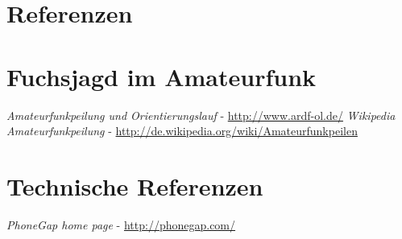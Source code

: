 
\newpage
\section{Referenzen} %
\label{sec:referenzen}

\begin{thebibliography}{breitestes Label}

\section*{Fuchsjagd im Amateurfunk}
    \textit{Amateurfunkpeilung und Orientierungslauf} - \url{http://www.ardf-ol.de/}
    \textit{Wikipedia Amateurfunkpeilung} - \url{http://de.wikipedia.org/wiki/Amateurfunkpeilen}
\section*{Technische Referenzen} 
    \textit{PhoneGap home page} - \url{http://phonegap.com/}

\end{thebibliography}

